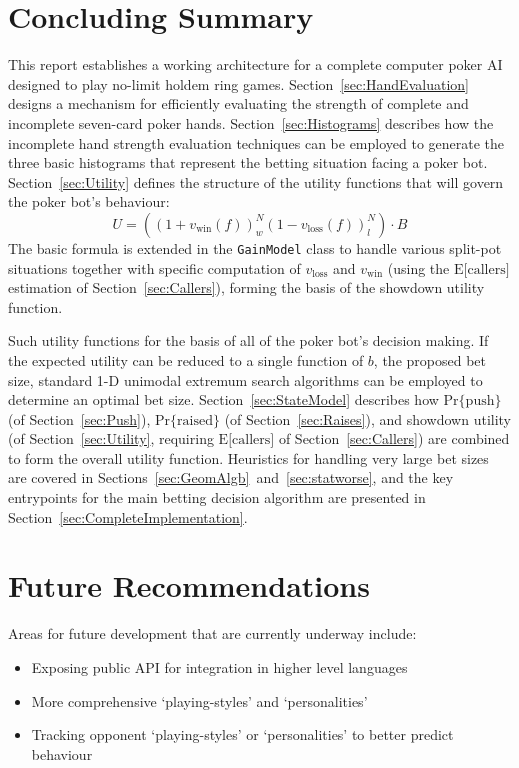 


\chapter{Concluding Summary}
\label{sec:Summary}

This report establishes a working architecture for a complete computer poker AI designed to play no-limit holdem ring games.
Section~\ref{sec:HandEvaluation} designs a mechanism for efficiently evaluating the strength of complete and incomplete seven-card poker hands.
Section~\ref{sec:Histograms} describes how the incomplete hand strength evaluation techniques can be employed to generate the three basic histograms that represent the betting situation facing a poker bot.
Section~\ref{sec:Utility} defines the structure of the utility functions that will govern the poker bot's behaviour:
\[
U = \left( \left( 1 + v_{\mathrm{win}} \left( f \right) \right)^N_w \left( 1 - v_{\mathrm{loss}} \left( f \right) \right)^N_l \right) \cdot B
\]
The basic formula is extended in the \texttt{GainModel} class to handle various split-pot situations together with specific computation of $v_{\mathrm{loss}}$ and $v_{\mathrm{win}}$ (using the $\mathrm{E[callers}]$ estimation of Section~\ref{sec:Callers}), forming the basis of the showdown utility function.

Such utility functions for the basis of all of the poker bot's decision making.
If the expected utility can be reduced to a single function of $b$, the proposed bet size, standard 1-D unimodal extremum search algorithms can be employed to determine an optimal bet size.
Section~\ref{sec:StateModel} describes how $\mathrm{Pr\{push}\}$ (of Section~\ref{sec:Push}), $\mathrm{Pr\{raised}\}$ (of Section~\ref{sec:Raises}), and showdown utility (of Section~\ref{sec:Utility}, requiring $\mathrm{E[callers}]$ of Section~\ref{sec:Callers}) are combined to form the overall utility function.
Heuristics for handling very large bet sizes are covered in Sections~\ref{sec:GeomAlgb}~and~\ref{sec:statworse}, and the key entrypoints for the main betting decision algorithm are presented in Section~\ref{sec:CompleteImplementation}.



\chapter{Future Recommendations}
\label{sec:FutureDirection}

Areas for future development that are currently underway include:
\begin{itemize}
\singlespace
\item Exposing public API for integration in higher level languages
\item More comprehensive `playing-styles' and `personalities'
\item Tracking opponent `playing-styles' or `personalities' to better predict behaviour
\end{itemize}


